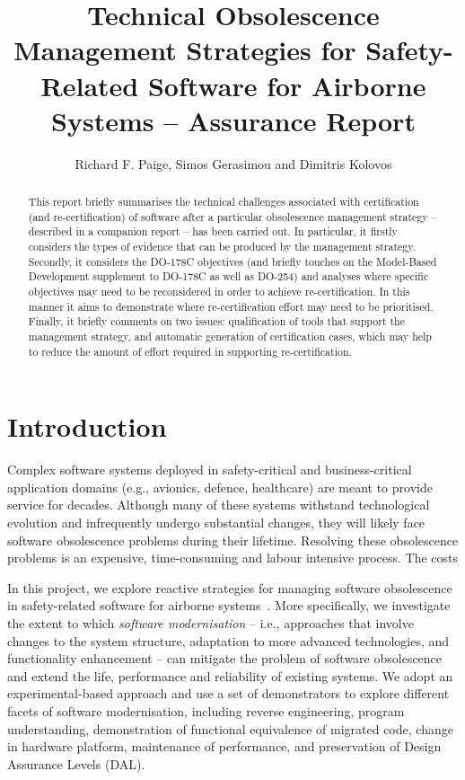 \documentclass{llncs}
\begin{document}
\title{Technical Obsolescence Management Strategies for Safety-Related Software for Airborne Systems -- Assurance Report}

\author{Richard F. Paige, Simos Gerasimou and Dimitris Kolovos}

\maketitle

\begin{abstract}
This report briefly summarises the technical challenges associated with certification (and re-certification)
of software after a particular obsolescence management strategy -- described in a companion report -- has
been carried out. In particular, it firstly considers the types of evidence that can
be produced by the management strategy. Secondly, it considers the DO-178C objectives (and briefly touches on the Model-Based Development supplement to DO-178C as well as DO-254) and analyses where specific objectives
may need to be reconsidered in order to achieve re-certification. In this manner it aims to demonstrate where
re-certification effort may need to be prioritised. Finally, it briefly comments on two issues: qualification of tools that support
the management strategy, and automatic generation of certification cases, which may help to reduce the amount of effort 
required in supporting re-certification.
\end{abstract}

\section{Introduction}
Complex software systems deployed in safety-critical and business-critical 
application domains (e.g., avionics, defence, healthcare) are meant to provide 
service for decades. Although many of these systems withstand technological 
evolution and infrequently undergo substantial changes, they will likely face 
software obsolescence problems during their lifetime. 
Resolving these obsolescence problems is an expensive, time-consuming and 
labour intensive process. The costs

In this project, we explore reactive strategies for managing software 
obsolescence in safety-related software for airborne 
systems~\cite{ProjectResponse}. More specifically, we 
investigate the extent to which \textit{software modernisation} -- i.e., 
approaches that involve changes to the system 
structure, adaptation to more advanced technologies, and functionality 
enhancement -- can mitigate the problem of software obsolescence and extend the 
life, performance and reliability of existing systems. We adopt an 
experimental-based approach and use a set of demonstrators to explore different 
facets of software modernisation, 
including reverse engineering, program understanding, demonstration of 
functional equivalence of 
migrated code, change in hardware platform, maintenance of performance, and 
preservation of Design Assurance Levels (DAL).
\end{document}
